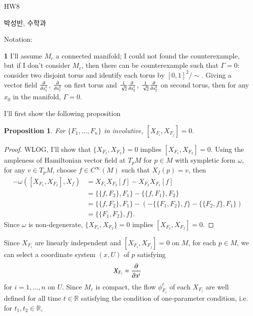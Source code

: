 \documentclass[a4paper, 12pt]{article}
\theoremstyle{Mydefinition}
\theoremstyle{Mytheorem}
\newtheorem{proposition}[statement]{Proposition}
\begin{document}
\thispagestyle{myfirstpage}
\begin{center}
    \Large{HW8}
\end{center}
박성빈, 수학과

Notation: 

\noindent \textbf{1}
I'll assume $M_c$ a connected manifold; I could not found the counterexample, but if I don't consider $M_c$, then there can be counterexample such that $\Gamma = 0$: consider two disjoint torus and identify each torus by $[0,1]^2/\sim$. Giving a vector field $\pdv{x_1^1}$, $\pdv{x_1^2}$ on first torus and $\frac{1}{\sqrt{2}}\pdv{x_2^1}$, $\frac{1}{\sqrt{2}}\pdv{x_2^2}$ on second torus, then for any $x_0$ in the manifold, $\Gamma = 0$.

I'll first show the following proposition
\begin{proposition}
    For $\{F_1, \ldots, F_n\}$ in involutive, $[X_{F_i}, X_{F_j}] = 0$.
\end{proposition}
\begin{proof}
WLOG, I'll show that $\{X_{F_1},X_{F_2}\}=0$ implies $[X_{F_1}, X_{F_2}] = 0$. Using the ampleness of Hamiltonian vector field at $T_pM$ for $p\in M$ with sympletic form $\omega$, for any $v\in T_pM$, choose $f\in C^\infty(M)$ such that $X_f(p) = v$, then
    \begin{equation*}
        \begin{split}
        -\omega([X_{F_1}, X_{F_2}], X_f) &= X_{F_1}X_{F_2}[f] - X_{F_2}X_{F_1}[f]\\
        &=\{\{f, F_2\}, F_1\} - \{\{f, F_1\}, F_2\}\\
        &=\{\{f, F_2\}, F_1\} - \left(-\{\{F_1, F_2\}, f\} - \{\{F_2, f\}, F_1\}\right)\\
        &=\{\{F_1, F_2\}, f\}.
        \end{split}
    \end{equation*}
    Since $\omega$ is non-degenerate, $\{X_{F_1},X_{F_2}\}=0$ implies $[X_{F_1},X_{F_2}] = 0$.
\end{proof}
Since $X_{F_i}$ are linearly independent and $[X_{F_i},X_{F_j}] = 0$ on $M$, for each $p\in M$, we can select a coordinate system $(x,U)$ of $p$ satisfying
\begin{equation}\label{HW8:EQ1}
    X_{F_i} = \pdv{x^i}
\end{equation}
for $i=1,\ldots, n$ on $U$. Since $M_c$ is compact, the flow $\phi^t_{F_i}$ of each $X_{F_i}$ are well defined for all time $t\in \mathbb{R}$ satisfying the condition of one-parameter condition, i.e. for $t_1,t_2\in \mathbb{R}$, 
\end{document}
